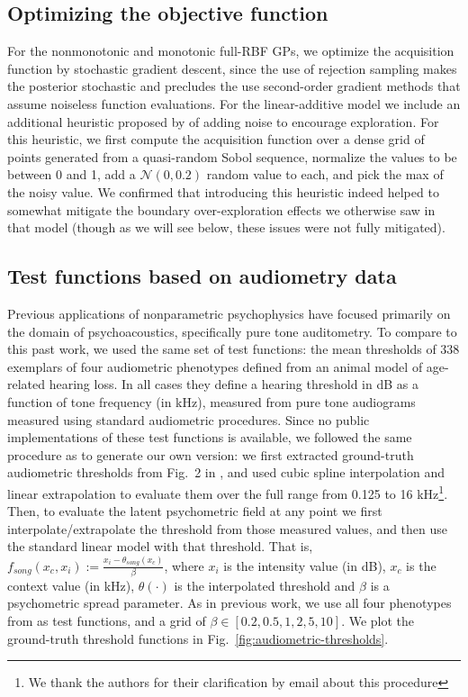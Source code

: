 \documentclass[../main.tex]{subfiles}
\begin{document}
\subsection{Optimizing the objective function}

For the nonmonotonic and monotonic full-RBF GPs, we optimize the acquisition function by stochastic gradient descent, since the use of rejection sampling makes the posterior stochastic and precludes the use second-order gradient methods that assume noiseless function evaluations. For the linear-additive model we include an additional heuristic proposed by \citet{Song2018} of adding noise to encourage exploration. For this heuristic, we first compute the acquisition function over a dense grid of points generated from a quasi-random Sobol sequence, normalize the values to be between 0 and 1, add a $\mathcal{N}(0, 0.2)$ random value to each, and pick the max of the noisy value. We confirmed that introducing this heuristic indeed helped to somewhat mitigate the boundary over-exploration effects we otherwise saw in that model (though as we will see below, these issues were not fully mitigated).

\subsection{Test functions based on audiometry data}
Previous applications of nonparametric psychophysics have focused primarily on the domain of psychoacoustics, specifically pure tone auditometry. To compare to this past work, we used the same set of test functions: the mean thresholds of 338 exemplars of four audiometric phenotypes defined from an animal model of age-related hearing loss. In all cases they define a hearing threshold in dB as a function of tone frequency (in kHz), measured from pure tone audiograms measured using standard audiometric procedures. Since no public implementations of these test functions is available, we followed the same procedure as \citet{Song2017b} to generate our own version: we first extracted ground-truth audiometric thresholds from Fig.~2 in \citet{Dubno2013}, and used cubic spline interpolation and linear extrapolation to evaluate them over the full range from 0.125 to 16 kHz\footnote{We thank the authors for their clarification by email about this procedure}. Then, to evaluate the latent psychometric field at any point we first interpolate/extrapolate the threshold from those measured values, and then use the standard linear model with that threshold. That is, $f_{song}(x_c, x_i) := \frac{x_i-\theta_{song}(x_c)}{\beta}$, where $x_i$ is the intensity value (in dB), $x_c$ is the context value (in kHz), $\theta(\cdot)$ is the interpolated threshold and $\beta$ is a psychometric spread parameter. As in previous work, we use all four phenotypes from \citet{Dubno2013} as test functions, and a grid of $\beta \in [0.2, 0.5, 1, 2, 5, 10]$. We plot the ground-truth threshold functions in Fig.~\ref{fig:audiometric-thresholds}.
\end{document}
